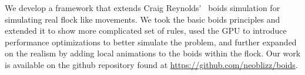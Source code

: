We develop a framework that extends Craig Reynolds'~\cite{Reynolds:1987} boids simulation for simulating real flock like movements. We took the basic boids principles and extended it to show more complicated set of rules, used the GPU to introduce performance optimizations to better simulate the problem, and further expanded on the realism by adding local animations to the boids within the flock. Our work is available on the github repository found at \url{https://github.com/neoblizz/boids}.